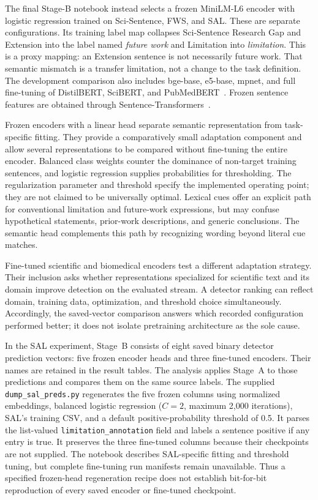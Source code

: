The final Stage-B notebook instead selects a frozen MiniLM-L6 encoder with logistic regression
trained on Sci-Sentence, FWS, and SAL. These are separate configurations. Its training label map
collapses Sci-Sentence Research Gap and Extension into the label named \emph{future work} and
Limitation into \emph{limitation}. This is a proxy mapping: an Extension sentence is not necessarily
future work. That semantic mismatch is a transfer limitation, not a change to the task definition.
The development comparison also includes bge-base, e5-base, mpnet, and full fine-tuning of
DistilBERT, SciBERT, and PubMedBERT~\citep{sanh2019distilbert,beltagy2019scibert,gu2021pubmedbert}.
Frozen sentence features are obtained through Sentence-Transformers~\citep{reimers2019sentencebert}.

Frozen encoders with a linear head separate semantic representation from task-specific fitting.
They provide a comparatively small adaptation component and allow several representations to be
compared without fine-tuning the entire encoder. Balanced class weights counter the dominance of
non-target training sentences, and logistic regression supplies probabilities for thresholding.
The regularization parameter and threshold specify the implemented operating point; they are not
claimed to be universally optimal. Lexical cues offer an explicit path for conventional limitation
and future-work expressions, but may confuse hypothetical statements, prior-work descriptions,
and generic conclusions. The semantic head complements this path by recognizing wording beyond
literal cue matches.

Fine-tuned scientific and biomedical encoders test a different adaptation strategy. Their inclusion
asks whether representations specialized for scientific text and its domain improve detection on
the evaluated stream. A detector ranking can reflect domain, training data, optimization, and
threshold choice simultaneously. Accordingly, the saved-vector comparison answers which recorded
configuration performed better; it does not isolate pretraining architecture as the sole cause.

In the SAL experiment, Stage~B consists of eight saved binary detector prediction vectors: five
frozen encoder heads and three fine-tuned encoders. Their names are retained in the result tables.
The analysis applies Stage~A to those predictions and compares them on the same source labels.
The supplied \texttt{dump\_sal\_preds.py} regenerates the five frozen columns using normalized
embeddings, balanced logistic regression ($C=2$, maximum 2,000 iterations), SAL's training CSV,
and a default positive-probability threshold of 0.5. It parses the list-valued
\texttt{limitation\_annotation} field and labels a sentence positive if any entry is true.
It preserves the three fine-tuned columns because their checkpoints are not supplied. The
notebook describes SAL-specific fitting and threshold tuning, but complete fine-tuning run
manifests remain unavailable. Thus a specified frozen-head regeneration recipe does not establish
bit-for-bit reproduction of every saved encoder or fine-tuned checkpoint.

